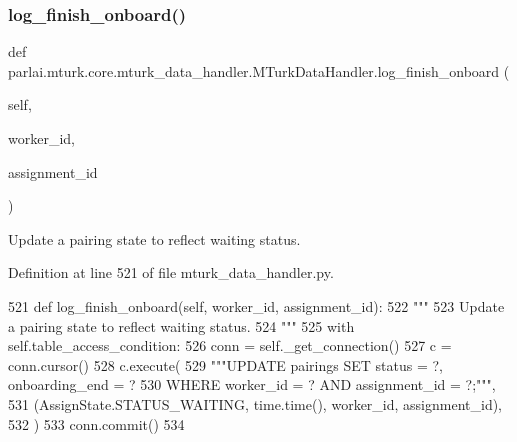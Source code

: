 \subsubsection{\texorpdfstring{log\+\_\+finish\+\_\+onboard()}{log\_finish\_onboard()}}
{\footnotesize\ttfamily def parlai.\+mturk.\+core.\+mturk\+\_\+data\+\_\+handler.\+M\+Turk\+Data\+Handler.\+log\+\_\+finish\+\_\+onboard (\begin{DoxyParamCaption}\item[{}]{self,  }\item[{}]{worker\+\_\+id,  }\item[{}]{assignment\+\_\+id }\end{DoxyParamCaption})}

\begin{DoxyVerb}Update a pairing state to reflect waiting status.
\end{DoxyVerb}
 

Definition at line 521 of file mturk\+\_\+data\+\_\+handler.\+py.


\begin{DoxyCode}
521     \textcolor{keyword}{def }log\_finish\_onboard(self, worker\_id, assignment\_id):
522         \textcolor{stringliteral}{"""}
523 \textcolor{stringliteral}{        Update a pairing state to reflect waiting status.}
524 \textcolor{stringliteral}{        """}
525         with self.table\_access\_condition:
526             conn = self.\_get\_connection()
527             c = conn.cursor()
528             c.execute(
529                 \textcolor{stringliteral}{"""UPDATE pairings SET status = ?, onboarding\_end = ?}
530 \textcolor{stringliteral}{                         WHERE worker\_id = ? AND assignment\_id = ?;"""},
531                 (AssignState.STATUS\_WAITING, time.time(), worker\_id, assignment\_id),
532             )
533             conn.commit()
534 
\end{DoxyCode}
\mbox{\label{classparlai_1_1mturk_1_1core_1_1mturk__data__handler_1_1MTurkDataHandler_acfa910fb6805c19a8693b7688f1fb133}} 
